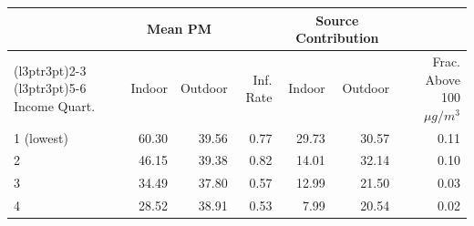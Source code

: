 \begin{table}[!h]
\centering
\begin{tabular}{lrrrrrr}
\toprule
\multicolumn{1}{c}{ } & \multicolumn{2}{c}{Mean PM} & \multicolumn{1}{c}{ } & \multicolumn{2}{c}{Source Contribution} & \multicolumn{1}{c}{ } \\
\cmidrule(l{3pt}r{3pt}){2-3} \cmidrule(l{3pt}r{3pt}){5-6}
Income Quart. & Indoor & Outdoor & Inf. Rate & Indoor & Outdoor & Frac. Above 100 $\mu g/m^3$\\
\midrule
1 (lowest) & 60.30 & 39.56 & 0.77 & 29.73 & 30.57 & 0.11\\
2 & 46.15 & 39.38 & 0.82 & 14.01 & 32.14 & 0.10\\
3 & 34.49 & 37.80 & 0.57 & 12.99 & 21.50 & 0.03\\
4 & 28.52 & 38.91 & 0.53 & 7.99 & 20.54 & 0.02\\
\bottomrule
\end{tabular}
\end{table}
